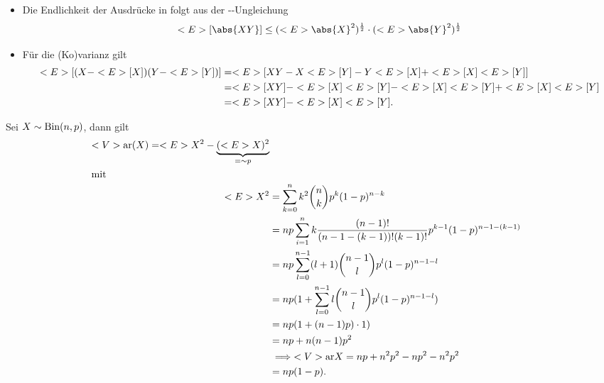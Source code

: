 \begin{*remark}
	\begin{itemize}
		\item Die Endlichkeit der Ausdrücke in  folgt aus der --Ungleichung
		\[
		\E[\abs{XY}] \le (\E\abs{X}^2)^{\frac{1}{2}}\cdot (\E\abs{Y}^2)^{\frac{1}{2}}
		\]
		\item Für die (Ko)varianz gilt
		\begin{align*}
			<E>[(X -<E>[X])(Y-<E>[Y])] &= <E>[XY - X<E>[Y] - Y<E>[X] + <E>[X]<E>[Y]]\\
			&= <E>[XY] - <E>[X]<E>[Y] - <E>[X]<E>[Y] + <E>[X]<E>[Y]\\
			&= <E>[XY] - <E>[X]<E>[Y].
		\end{align*}
	\end{itemize}
\end{*remark}
\begin{example}
	Sei $X\sim\operatorname{Bin}(n,p)$, dann gilt
	\begin{align*}
		<V>\text{ar}(X) = <E> X^2 - \underbrace{(<E> X)^2}_{=\sim p}\\
		\intertext{mit}
		<E> X^2 &= \sum_{k=0}^n k^2 \binom{n}{k}p^k (1-p)^{n-k}\\
		&= np \sum_{i=1}^n k \frac{(n-1)!}{(n-1-(k-1))!(k-1)!} p^{k-1}(1-p)^{n-1-(k-1)}\\
		&= np\sum_{l=0}^{n-1}(l+1)\binom{n-1}{l}p^l (1-p)^{n-1-l}\\
		&= np(1 + \sum_{l=0}^{n-1}l \binom{n-1}{l}p^l (1-p)^{n-1-l})\\
		&= np(1+(n-1)p)\cdot 1)\\
		&= np + n(n-1)p^2\\
		&\implies <V>\text{ar} X = np + n^2p^2 - np^2 - n^2p^2\\
		&= np(1-p). 
	\end{align*}
\end{example}